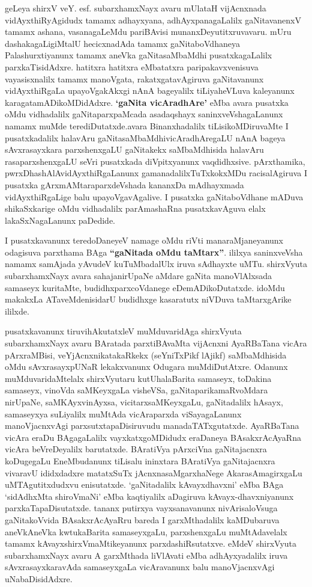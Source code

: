 geLeya shirxV veY. esf. subarxhamxNayx avaru mUlataH vijAcnxnada vidAyxthiRyAgidudx tamamx adhayxyana, adhAyxpanagaLalilx gaNitavanenxV tamamx ashana, vasanagaLeMdu pariBAvisi\- munanxDeyutitxruvavaru. mUru dashakagaLigiMtalU hecicxnadAda tamamx gaNitaboVdha\-neya Palashurxtiyanunx tamamx aneVka gaNitasaMbaMdhi pusatxkagaLalilx parxkaTisidAdxre. hatitxra hatitxra eMbatatxra paripakavxvenisuva vayasisxnalilx tamamx manoVgata, rakatxgatavAgiruva gaNitavanunx vidAyxthiRgaLa upayoVgakAkxgi nAnA bageyalilx tiLiyaheVLuva kale\-yanunx karagatamADikoMDidAdxre. {\bf `gaNita vicAradhAre'} eMba avara pusatxka oMdu vidhadalilx gaNitaparxpaMcada asadaqshayx saninxveVshagaLanunx namamx muMde terediDutatxde.\break avara Binanxhadalilx tiLisikoMDiruvaMte I pusatxkadalilx halavAru gaNitasaMbaMdhi\break vicAradhAregaLU nAnA bageya sAvxrasayxkara parxshenxgaLU gaNitakekx saMbaMdhisida hala\-vAru rasaparxshenxgaLU seVri pusatxkada diVpitxyanunx vaqdidhxsive. pArxthamika, pwrxDhashAlA\-vidAyxthiRgaLanunx gamanadalilxTuTxkokxMDu racisalAgiruva I pusatxka gArxmAMtara\break parxdeVshada kananxDa mAdhayxmada vidAyxthiRgaLige balu upayoVgavAgalive. I pusatxka gaNitaboVdhane mADuva shikaSxkarige oMdu vidhadalilx parAmashaRna pusatxkavAguva elalx lakaSxNagaLanunx paDedide.

\bigskip

I pusatxkavanunx teredoDaneyeV namage oMdu riVti manaraMjaneyanunx odagisuva parxthama BAga {\bf ``gaNitada oMdu taMtarx''}. ililxya saninxveVsha namamx samAjada yAvudeV kuTuMbadalUlx iruva sAdhayxte uMTu. shirxVyuta subarxhamxNayx avara sahajanirUpaNe aMdare gaNita manoVlAlxsada samaseyx kuritaMte, budidhxparxcoVdanege eDemADikoDutatxde. idoMdu makakxLa ATaveMdenisidarU budidhxge kasaratutx niVDuva taMtarxgArike ililxde.

\bigskip

pusatxkavanunx tiruvihAkutatxleV muMduvaridAga shirxVyuta subarxhamxNayx avaru BAratada parxtiBAvaMta vijAcnxni AyaRBaTana vicAra pArxraMBisi, veYjAcnxnikatakaRkekx (seYniTxPikf lAjikf) saMbaMdhisida oMdu sAvxrasayxpUNaR lekakxvanunx Odugara muMdiDutAtxre. Odanunx muMduvaridaMtelalx shirxVyutaru kutUhalaBarita samaseyx, toDakina samaseyx, vinoVda saMKeyxgaLa visheVSa, gaNitaparikamaRvoMdara nirUpaNe, saMKAyxvinAyxsa, vicitarxsaMKeyxgaLu, gaNitadalilx hAsayx, samaseyxya suLiyalilx muMtAda vicAraparxda viSayagaLanunx manoVjacnxvAgi parxsutxtapaDisiruvudu manadaTATxgutatxde. AyaRBaTana vicAra eraDu BAgagaLalilx vayxkatxgoMDidudx eraDaneya BAsakxrAcAyaRna vicAra beVreDeyalilx barutatxde. BAratiVya pArxciVna gaNitajacnxra koDugegaLu EneMbudanunx tiLisalu ininxtara BAratiVya gaNitajacnxra vivaravU ididxdadxre matatxSuTx jAcnxnasaMgarxhaNege AkarasAmagirxgaLu uMTAgutitxdudxvu enisutatxde. `gaNitadalilx kAvayxdhavxni' eMba BAga `sidAdhxMta shiroVmaNi' eMba kaqtiyalilx aDagiruva kAvayx-dhavxniyanunx parxkaTapaDisutatxde. tananx putirxya vayxsanavanunx nivArisaloVsuga gaNitakoVvida BAsakxrAcAyaRru bareda I garxMthadalilx kaMDubaruva aneVkAneVka kwtukaBarita samaseyxgaLu, parxshenxgaLu muMtAdavelalx tamamx kAvayxshirxVmaMtikeyanunx parxdashiRsutatxve. eMdeV shirxVyuta subarxhamxNayx avaru A garxMthada liVlAvati eMba adhAyxyadalilx iruva sAvxrasayxkaravAda samaseyxgaLa vicAravanunx balu manoVjacnxvAgi uNabaDisidAdxre.

